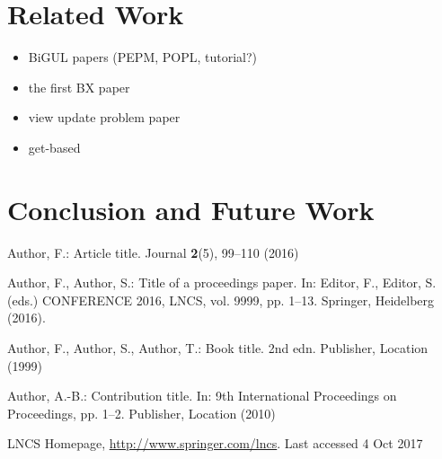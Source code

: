 \documentclass[runningheads]{llncs}
\begin{document}
\section{Related Work}

\begin{itemize}
\item BiGUL papers (PEPM, POPL, tutorial?)
\item the first BX paper
\item view update problem paper
\item get-based 
\end{itemize}



\newpage


\section{Conclusion and Future Work}


% 
%
%
% 
% 
%
\begin{thebibliography}{8}
Author, F.: Article title. Journal \textbf{2}(5), 99--110 (2016)

Author, F., Author, S.: Title of a proceedings paper. In: Editor,
F., Editor, S. (eds.) CONFERENCE 2016, LNCS, vol. 9999, pp. 1--13.
Springer, Heidelberg (2016). 

Author, F., Author, S., Author, T.: Book title. 2nd edn. Publisher,
Location (1999)

Author, A.-B.: Contribution title. In: 9th International Proceedings
on Proceedings, pp. 1--2. Publisher, Location (2010)

LNCS Homepage, \url{http://www.springer.com/lncs}. Last accessed 4
Oct 2017
\end{thebibliography}
\end{document}

